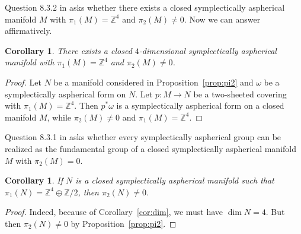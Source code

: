 \documentclass[12pt]{amsart}
\newcommand{\B}[1]{{\mathbb #1}}
\newcommand{\Z}{\B Z}
\newtheorem{cory}[subsection]{Corollary}
\theoremstyle{definition}
\theoremstyle{remark}
\numberwithin{figure}{section}
\numberwithin{table}{section}
\numberwithin{equation}{section}
\newcommand\propref{Proposition~\ref}
\newcommand\corref{Corollary~\ref}
\begin{document}
Question 8.3.2 in \cite{IKRT} asks whether there exists a closed symplectically 
aspherical manifold 
$M$ with $\pi_1(M)=\B Z^4$ and $\pi_2(M)\ne 0$. Now we can answer affirmatively.

\begin{cory}\label{cor:z4}
There exists a closed $4$-dimensional symplectically aspherical manifold with 
$\pi_1(M)=\B Z^4$ and $\pi_2(M)\ne 0$. 
\end{cory} 

\begin{proof} Let $N$ be a manifold considered in \propref{prop:pi2} and $\omega$ be a symplectically aspherical form on $N$.
Let $p:M \to N$ be a two-sheeted covering with
$\pi_1(M)=\Z^4$. Then $p^*\omega$ is a symplectically aspherical form on a closed manifold $M$,
while $\pi_2(M)\ne 0$ and $\pi_1(M)=\B Z^4$.
\end{proof}

Question 8.3.1 in \cite{IKRT} asks whether every symplectically aspherical 
group can be realized as the fundamental group of a  closed symplectically aspherical 
manifold $M$ with $\pi_2(M)=0$.

\begin{cory}\label{cor:pi2} 
If $N$ is a  closed symplectically aspherical manifold such 
that  $\pi_1(N)=\Z^4\oplus \Z/2$, then $\pi_2(N)\ne 0$.
\end{cory}

\begin{proof} Indeed, because of \corref{cor:dim}, we must have $\dim N=4$. But 
then $\pi_2(N)\ne 0$ by \propref{prop:pi2}.
\end{proof}


 
\end{document}
